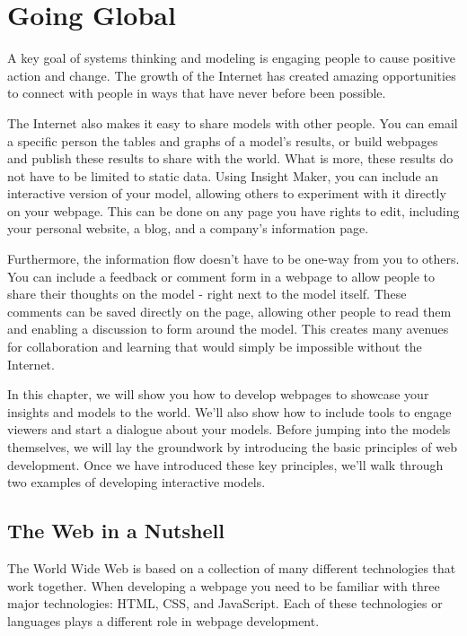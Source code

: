 \documentclass[]{memoir}
\begin{document}
\chapter{Going Global}

A key goal of systems thinking and modeling is engaging people to cause
positive action and change. The growth of the Internet has created
amazing opportunities to connect with people in ways that have never
before been possible.

The Internet also makes it easy to share models with other people. You
can email a specific person the tables and graphs of a model's results,
or build webpages and publish these results to share with the world.
What is more, these results do not have to be limited to static data.
Using Insight Maker, you can include an interactive version of your
model, allowing others to experiment with it directly on your webpage.
This can be done on any page you have rights to edit, including your
personal website, a blog, and a company's information page.

Furthermore, the information flow doesn't have to be one-way from you to
others. You can include a feedback or comment form in a webpage to allow
people to share their thoughts on the model - right next to the model
itself. These comments can be saved directly on the page, allowing other
people to read them and enabling a discussion to form around the model.
This creates many avenues for collaboration and learning that would
simply be impossible without the Internet.

In this chapter, we will show you how to develop webpages to showcase
your insights and models to the world. We'll also show how to include
tools to engage viewers and start a dialogue about your models. Before
jumping into the models themselves, we will lay the groundwork by
introducing the basic principles of web development. Once we have
introduced these key principles, we'll walk through two examples of
developing interactive models.

\section{The Web in a Nutshell}

The World Wide Web is based on a collection of many different
technologies that work together. When developing a webpage you need to
be familiar with three major technologies: HTML, CSS, and JavaScript.
Each of these technologies or languages plays a different role in
webpage development.
\end{document}
